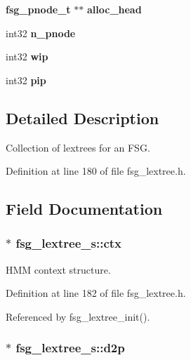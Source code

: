 \begin{DoxyCompactItemize}
\item 
{\bf fsg\+\_\+pnode\+\_\+t} $\ast$$\ast$ {\bfseries alloc\+\_\+head}\label{structfsg__lextree__s_a430605e77e2ad3de2b5e2aa1fb7eb365}

\item 
int32 {\bfseries n\+\_\+pnode}\label{structfsg__lextree__s_ac55755e9f9453acab71a23a5cf3ea542}

\item 
int32 {\bfseries wip}\label{structfsg__lextree__s_a791fcaf2440b7d90796c5e7e50a7b186}

\item 
int32 {\bfseries pip}\label{structfsg__lextree__s_a9e6768eff7003453759b1ade9cb50bc7}

\end{DoxyCompactItemize}


\subsection{Detailed Description}
Collection of lextrees for an F\+S\+G. 

Definition at line 180 of file fsg\+\_\+lextree.\+h.



\subsection{Field Documentation}
\subsubsection[{ctx}]{$\ast$ fsg\+\_\+lextree\+\_\+s\+::ctx}\label{structfsg__lextree__s_afbbd5d59a74dfb287289aa20a9a3979a}


H\+M\+M context structure. 



Definition at line 182 of file fsg\+\_\+lextree.\+h.



Referenced by fsg\+\_\+lextree\+\_\+init().

\subsubsection[{d2p}]{$\ast$ fsg\+\_\+lextree\+\_\+s\+::d2p}\label{structfsg__lextree__s_add12fb7151ebdecb74deaf6aca86d95e}


